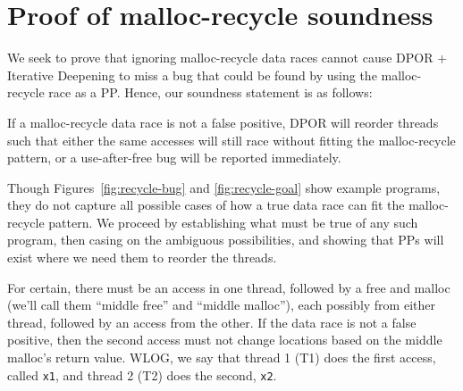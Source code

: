 \section{Proof of malloc-recycle soundness}
\label{sec:proof}

We seek to prove that ignoring malloc-recycle data races cannot cause DPOR + Iterative Deepening to miss a bug that could be found by using the malloc-recycle race as a PP. Hence, our soundness statement is as follows:

\begin{theorem}
	If a malloc-recycle data race is not a false positive, DPOR will reorder threads such that either the same accesses will still race without fitting the malloc-recycle pattern, or a use-after-free bug will be reported immediately.
\end{theorem}

Though Figures~\ref{fig:recycle-bug} and \ref{fig:recycle-goal} show example programs, they do not capture all possible cases of how a true data race can fit the malloc-recycle pattern.
We proceed by establishing what must be true of any such program, then casing on the ambiguous possibilities, and showing that PPs will exist where we need them to reorder the threads.

For certain, there must be an access in one thread, followed by a free and malloc (we'll call them ``middle free'' and ``middle malloc''), each possibly from either thread, followed by an access from the other.
If the data race is not a false positive, then the second access must not change locations based on the middle malloc's return value.
WLOG, we say that thread 1 (T1) does the first access, called {\tt x1}, and thread 2 (T2) does the second, {\tt x2}.

